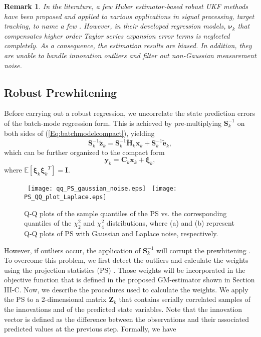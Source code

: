 \documentclass[10pt]{IEEEtran}
\newtheorem*{remark}{Remark}
\begin{document}
\begin{remark}
In the literature, a few Huber estimator-based robust UKF methods have been proposed and applied to various applications in signal processing, target tracking, to name a few \cite{Chang2012,Chang2013,Chang2015}. However, in their developed regression models, $\bm{\nu}_k$ that compensates higher order Taylor series expansion error terms is neglected completely. As a consequence, the estimation results are biased. In addition, they are unable to handle innovation outliers and filter out non-Gaussian measurement noise.
\end{remark}
\vspace{-0.3cm}
\subsection{Robust Prewhitening}
Before carrying out a robust regression, we uncorrelate the state prediction errors of the batch-mode regression form. This is achieved by pre-multiplying $\bm{S}_k^{ - 1}$ on both sides of (\ref{Eq:batchmodelcompact}), yielding
\begin{equation}
\bm{S}_k^{ - 1}{\bm{\widetilde z}_k} = \bm{S}_k^{ - 1}{\bm{\widetilde H}_k}{\bm{x}_k} + \bm{S}_k^{ - 1}{\bm{\widetilde e}_k},
\label{Eq:prewhiteningbatchmodel}
\end{equation}
which can be further organized to the compact form
\begin{equation}
{\bm{y}_k} = {\bm{C}_k}{\bm{x}_k} + {\bm{\xi} _k},
\label{Eq:finalbatchmodel}
\end{equation}
where $\mathbb{E}[{\bm{\xi} _k}{\bm{\xi}_k}^T]=\bm{I}$.
\begin{figure*}
\centering
  \mbox{{\label{subfig:a} \texttt{[image: qq\_PS\_gaussian\_noise.eps]}}}
  \mbox{{\label{subfig:b} \texttt{[image: PS\_QQ\_plot\_Laplace.eps]}}}
\caption{Q-Q plots of the sample quantiles of the PS vs. the corresponding quantiles of the $\chi_2^2$ and $\chi_4^2$ distributions, where (a) and (b) represent Q-Q plots of PS with Gaussian and Laplace noise, respectively.}
\label{Fig.PS_distributions}
\end{figure*}
However, if outliers occur, the application of $\bm{S}_k^{ - 1}$ will corrupt the prewhitening \cite{Lmili2010}. To overcome this problem, we first detect the outliers and calculate the weights using the projection statistics (PS) \cite{Lmili2010,Lmili1996}. Those weights will be incorporated in the objective function that is defined in the proposed GM-estimator shown in Section III-C. Now, we describe the procedures used to calculate the weights. We apply the PS to a 2-dimensional matrix $\bm{Z}_k$ that contains serially correlated samples of the innovations and of the predicted state variables. Note that the innovation vector is defined as the difference between the observations and their associated predicted values at the previous step. Formally, we have
\end{document}

